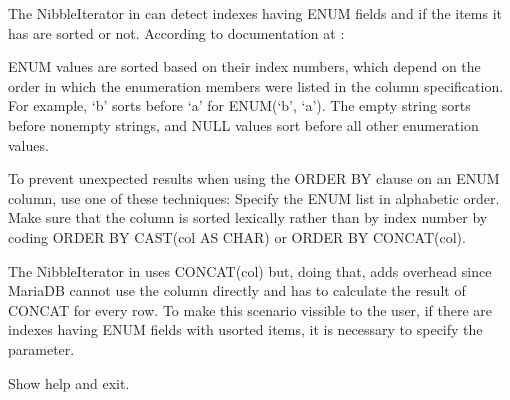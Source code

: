 \documentclass[letterpaper,10pt,english]{sphinxmanual}
\begin{document}
\begin{fulllineitems}
\label{\detokenize{mariadb-schema-change:cmdoption-mariadb-schema-change-force-concat-enums}}
The NibbleIterator in  can detect indexes having ENUM fields and
if the items it has are sorted or not. According to documentation at
:

ENUM values are sorted based on their index numbers, which depend on the order in
which the enumeration members were listed in the column specification.
For example, ‘b’ sorts before ‘a’ for ENUM(‘b’, ‘a’).
The empty string sorts before nonempty strings, and NULL values sort before all other
enumeration values.

To prevent unexpected results when using the ORDER BY clause on an ENUM column,
use one of these techniques:
\sphinxhyphen{} Specify the ENUM list in alphabetic order.
\sphinxhyphen{} Make sure that the column is sorted lexically rather than by index number by coding
ORDER BY CAST(col AS CHAR) or ORDER BY CONCAT(col).

The NibbleIterator in  uses CONCAT(col) but, doing that, adds overhead
since MariaDB cannot use the column directly and has to calculate the result of CONCAT
for every row.
To make this scenario vissible to the user, if there are indexes having ENUM fields
with usorted items, it is necessary to specify the  parameter.

\end{fulllineitems}


\begin{fulllineitems}
\label{\detokenize{mariadb-schema-change:cmdoption-mariadb-schema-change-help}}
Show help and exit.

\end{fulllineitems}
\end{document}
